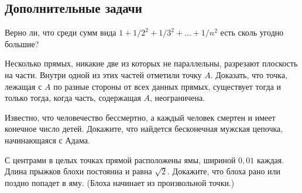 

\subsection*{Дополнительные задачи}


\begin{problems}

\item
Верно ли, что среди сумм вида $1 + 1 / 2^2 + 1 / 3^2 + \ldots + 1 /n^2$ есть
сколь угодно большие?

\item
Несколько прямых, никакие две из которых не параллельны, разрезают плоскость
на части.
Внутри одной из этих частей отметили точку $A$.
Доказать, что точка, лежащая с $A$ по разные стороны от всех данных прямых,
существует тогда и только тогда, когда часть, содержащая $A$, неограничена.

\item
Известно, что человечество бессмертно, а каждый человек смертен и имеет
конечное число детей.
Докажите, что найдется бесконечная мужская цепочка, начинающаяся с Адама.

\item
С центрами в целых точках прямой расположены ямы, шириной $0{,}01$ каждая.
Длина прыжков блохи постоянна и равна $\sqrt{2}$.
Докажите, что блоха рано или поздно попадет в яму.
(Блоха начинает из произвольной точки.)

\end{problems}

